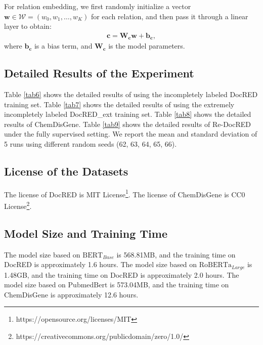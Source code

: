\documentclass[11pt]{article}
\begin{document}
For relation embedding, we first randomly initialize a vector $\boldsymbol{w} \in \mathcal{W}=\left(w_{0}, w_{1}, \ldots, w_{K}\right)$ for each relation, and then pass it through a linear layer to obtain:
\begin{equation}
\begin{aligned}
\boldsymbol{c} = \boldsymbol{W_{c}}\boldsymbol{w} + \boldsymbol{b_{c}},
\end{aligned}
\end{equation}
where $\boldsymbol{b_{c}}$ is a bias term, and $\boldsymbol{W_{c}}$ is the model parameters.

\subsection{Detailed Results of the Experiment}\label{A2}

Table \ref{tab6} shows the detailed results of using the incompletely labeled DocRED training set. Table \ref{tab7} shows the detailed results of using the extremely incompletely labeled DocRED\_ext training set. Table \ref{tab8} shows the detailed results of ChemDisGene. Table \ref{tab9} shows the detailed results of Re-DocRED under the fully supervised setting. We report the mean and standard deviation of 5 runs using different random seeds (62, 63, 64, 65, 66).

\subsection{License of the Datasets}\label{A3}

The license of DocRED is MIT License\footnote{https://opensource.org/licenses/MIT}. The license of ChemDisGene is CC0 License\footnote{https://creativecommons.org/publicdomain/zero/1.0/}.

\subsection{Model Size and Training Time}\label{A4}

The model size based on $\mathrm{BERT}_{Base}$ is 568.81MB, and the training time on DocRED is approximately 1.6 hours. The model size based on $\mathrm{RoBERTa}_{Large}$ is 1.48GB, and the training time on DocRED is approximately 2.0 hours. The model size based on $\mathrm{PubmedBert}$ is 573.04MB, and the training time on ChemDisGene is approximately 12.6 hours.

\end{document}
